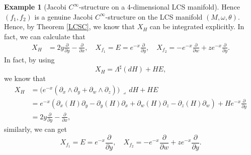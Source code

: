 \documentclass{article}
\theoremstyle{remark}
\theoremstyle{definition}
\newtheorem{example}{Example}[section]
\newcommand{\contract}{\,\lrcorner\,}
\begin{document}
\begin{example}[Jacobi $C^\infty$-structure on a 4-dimensional LCS manifold]
Hence $(f_1,f_2)$ is a genuine Jacobi $C^\infty$-structure on the LCS manifold $(M,\omega,\theta)$. Hence, by Theorem \ref{LCSC}, we know that $X_H$ can be integrated explicitly. In fact, we can calculate that
\begin{align*}
X_H&=2y\frac{\partial}{\partial y}-\frac{\partial}{\partial x},\quad X_{f_1}=E=e^{-x}\frac{\partial}{\partial y},\quad X_{f_2}=-e^{-x}\frac{\partial}{\partial w}+ze^{-x}\frac{\partial}{\partial y}.
\end{align*}
In fact, by using
$$X_H=\Lambda^\sharp(dH)+HE,$$ we know that
\begin{align*}
    X_H&=\big(e^{-x}( \partial_x \wedge \partial_y + \partial_w \wedge \partial_z )\big)\contract dH+HE\\
    &=e^{-x}(\partial_x(H)\partial_y-\partial_y(H)\partial_x+\partial_w(H)\partial_z-\partial_z(H)\partial_w)+He^{-x}\frac{\partial}{\partial y}\\
    &=2y\frac{\partial}{\partial y}-\frac{\partial}{\partial x},
\end{align*}
similarly, we can get
$$X_{f_1}=E=e^{-x}\frac{\partial}{\partial y},\quad X_{f_2}=-e^{-x}\frac{\partial}{\partial w}+ze^{-x}\frac{\partial}{\partial y}.$$


\end{example}
\end{document}
